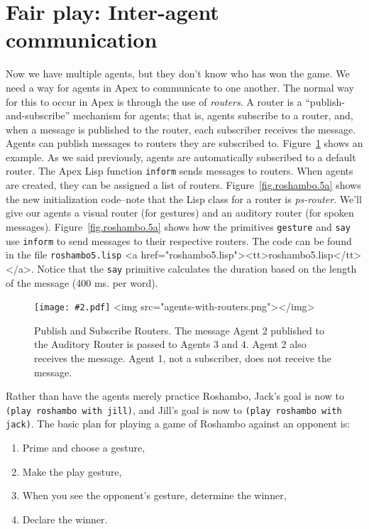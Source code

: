 \documentclass[12pt]{article}
\newcommand{\ic}{\texttt}
\newenvironment{float}%
   {\begin{center}}%
   {\end{center}
   }
\newcommand{\img}[2]
 {\texonly \texttt{[image: \#2.pdf]} \endtexonly
  \htmlonly \rawhtml <img src="#2.png"></img>\endrawhtml \endhtmlonly}
\newcommand{\fn}[1]{\texonly\texttt{#1}\endtexonly
  \htmlonly \rawhtml <a href="#1"><tt>#1</tt></a>\endrawhtml \endhtmlonly}
\begin{document}
\htmlpagebreak
\section{Fair play: Inter-agent communication}

Now we have multiple agents, but they don't know who has won the game.  We need a way for agents in Apex to communicate to one another. The normal way for this to occur in Apex is through the use of {\it routers}. A router is a ``publish-and-subscribe'' mechanism for agents; that is, agents subscribe to a router, and, when a message is published to the router, each subscriber receives the message. Agents can publish messages to routers they are subscribed to. Figure~\ref{fig.publish-and-subscribe} shows an example. As we said previously, agents are automatically  subscribed to a default router. The Apex Lisp function \ic{inform} sends messages to routers. When agents are created, they can be assigned a list of routers. Figure~\ref{fig.roshambo.5a} shows the new initialization code--note that the Lisp class for a router is {\it ps-router}. We'll give our agents a visual router (for gestures) and an auditory router (for spoken messages). Figure~\ref{fig.roshambo.5a} shows how the primitives \ic{gesture} and \ic{say} use \ic{inform} to send messages to their respective routers. The code can be found in the file \fn{roshambo5.lisp}. Notice that the \ic{say} primitive calculates the duration based on the length of the message (400 ms. per word).

\begin{figure}
\begin{float}
\centerline {
\img{4in}{agents-with-routers}
}
\end{float}
\caption{Publish and Subscribe Routers. The message Agent 2 published to the Auditory Router is passed to Agents 3 and 4. Agent 2 also receives the message. Agent 1, not a subscriber, does not receive the message.\label{fig.publish-and-subscribe}}
\end{figure}

Rather than have the agents merely practice Roshambo, Jack's goal is now to \ic{(play roshambo with jill)}, and Jill's goal is now to \ic{(play roshambo with jack)}. The basic plan for playing a game of Roshambo against an opponent is:

\begin{enumerate}
\item Prime and choose a gesture,
\item Make the play gesture,
\item When you see the opponent's gesture, determine the winner,
\item Declare the winner.
\end{enumerate}
\end{document}

